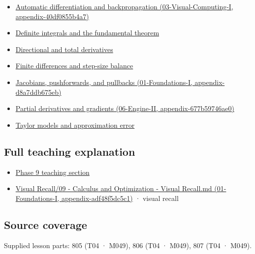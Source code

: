 \begin{itemize}
\tightlist
\item
  \href{}{Automatic differentiation and backpropagation (03-Visual-Computing-I, appendix-40df0855b4a7)}
\item
  \hyperref[appendix-1a50e72435c2]{Definite integrals and the fundamental theorem}
\item
  \hyperref[appendix-e2d476574aab]{Directional and total derivatives}
\item
  \hyperref[appendix-e2d7b4f2161d]{Finite differences and step-size balance}
\item
  \href{}{Jacobians, pushforwards, and pullbacks (01-Foundations-I, appendix-d8a7ddb675eb)}
\item
  \href{}{Partial derivatives and gradients (06-Engine-II, appendix-677b59746ae0)}
\item
  \hyperref[appendix-32f39e9a3738]{Taylor models and approximation error}
\end{itemize}

\subsection{Full teaching explanation}\label{full-teaching-explanation}

\begin{itemize}
\tightlist
\item
  \href{Continuous\%20Notes/Computing\%20Foundations\%20-\%20From\%20Bits\%20to\%20C++\%20and\%20Systems\%20APIs\#Functions,\%20limits,\%20continuity,\%20and\%20scalar\%20change}{Phase 9 teaching section}
\item
  \href{}{Visual Recall/09 - Calculus and Optimization - Visual Recall.md (01-Foundations-I, appendix-adf48f5dc5c1)} · visual recall
\end{itemize}

\subsection{Source coverage}\label{source-coverage}

Supplied lesson parts: 805 (T04 · M049), 806 (T04 · M049), 807 (T04 · M049).
